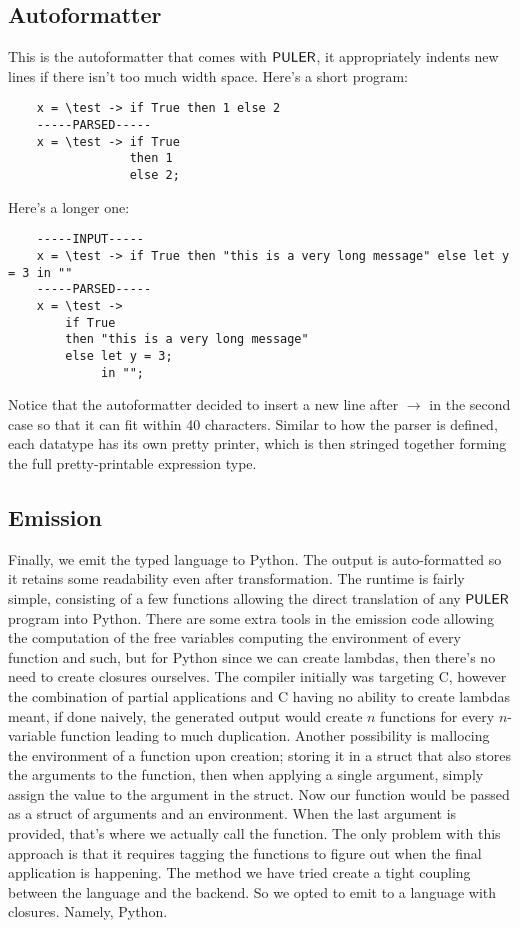     \subsection{Autoformatter}
    This is the autoformatter that comes with $\mathsf{PULER}$, it appropriately indents new lines if there isn't too much width space. Here's a short program:
    \begin{verbatim}
    x = \test -> if True then 1 else 2
    -----PARSED-----
    x = \test -> if True
                 then 1
                 else 2;
    \end{verbatim}
    Here's a longer one:
    \begin{verbatim}
    -----INPUT-----
    x = \test -> if True then "this is a very long message" else let y = 3 in ""
    -----PARSED-----
    x = \test ->
        if True
        then "this is a very long message"
        else let y = 3;
             in "";
    \end{verbatim}
    Notice that the autoformatter decided to insert a new line after $\to$ in the second case so that it can fit within 40 characters.
    Similar to how the parser is defined, each datatype has its own pretty printer, which is then stringed together forming the full pretty-printable expression type.
\subsection{Emission}\label{emission}
    Finally, we emit the typed language to Python. The output is auto-formatted so it retains some readability even after transformation. The runtime is fairly simple, consisting of a few functions allowing the direct translation of any $\mathsf{PULER}$ program into Python. There are some extra tools in the emission code allowing the computation of the free variables computing the environment of every function and such, but for Python since we can create lambdas, then there's no need to create closures ourselves. The compiler initially was targeting C, however the combination of partial applications and C having no ability to create lambdas meant, if done naively, the generated output would create $n$ functions for every $n$-variable function leading to much duplication. Another possibility is mallocing the environment of a function upon creation; storing it in a struct that also stores the arguments to the function, then when applying a single argument, simply assign the value to the argument in the struct. Now our function would be passed as a struct of arguments and an environment. When the last argument is provided, that's where we actually call the function. The only problem with this approach is that it requires tagging the functions to figure out when the final application is happening. The method we have tried create a  tight coupling between the language and the backend. So we opted to emit to a language with closures. Namely, Python.
